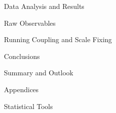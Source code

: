 \documentclass[twoside,english, a4paper, 11pt]{shared/uiofysmaster}
\begin{document}
\begin{part}{Data Analysis and Results}
	\label{part:results}
	\begin{chapter}{Raw Observables}
  		\label{chap:obs_results}
  		
	\end{chapter}

	\begin{chapter}{Running Coupling and Scale Fixing}
		\label{chap:advance_results}
		
  	\end{chapter}
\end{part}

\begin{part}{Conclusions}
	\label{part:conclusion}
	\begin{chapter}{Summary and Outlook}
		\label{chap:conclusion}
		
	\end{chapter}
	
\end{part}


\begin{part}{Appendices}
	\begin{appendices}
		\begin{chapter}{Statistical Tools}
			\label{appendix:resampling}
			
		\end{chapter}
	\end{appendices}
\end{part}





\begin{acknowledgements}
	
\end{acknowledgements}

\end{document}
